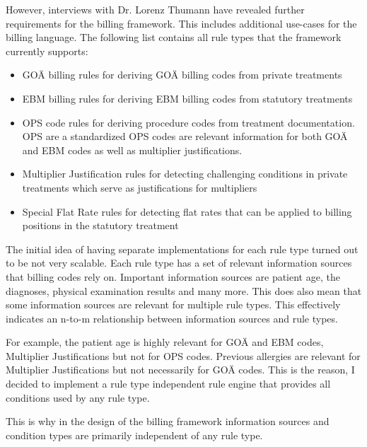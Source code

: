 However, interviews with Dr. Lorenz Thumann have revealed further requirements for the billing framework.
This includes additional use-cases for the billing language.
The following list contains all rule types that the framework currently supports:
\begin{itemize}
    \item GOÄ billing rules for deriving GOÄ billing codes from private treatments
    \item EBM billing rules for deriving EBM billing codes from statutory treatments
    \item OPS code rules for deriving procedure codes from treatment documentation.
    OPS are a standardized
    OPS codes are relevant information for both GOÄ and EBM codes as well as multiplier justifications.
    \item Multiplier Justification rules for detecting challenging conditions in private treatments
    which serve as justifications for multipliers
    \item Special Flat Rate rules
    for detecting flat rates that can be applied to billing positions in the statutory treatment
\end{itemize}



The initial idea of having separate implementations for each rule type turned out to be not very scalable.
Each rule type has a set of relevant information sources that billing codes rely on.
Important information sources are patient age, the diagnoses, physical examination results and many more.
This does also mean that some information sources are relevant for multiple rule types.
This effectively indicates an n-to-m relationship between information sources and rule types.

For example, the patient age is highly relevant for GOÄ and EBM codes, Multiplier Justifications but not for OPS codes.
Previous allergies are relevant for Multiplier Justifications but not necessarily for GOÄ codes.
This is the reason, I decided to implement a rule type independent rule engine that provides all conditions used by any rule type.

This is why in the design of the billing framework information sources and condition types are primarily independent of any rule type.

